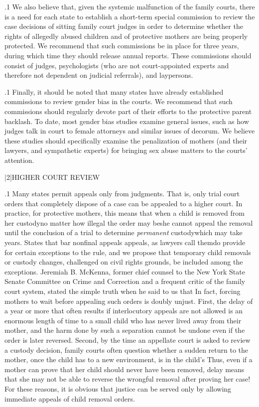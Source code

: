 \documentclass[11pt, twoside]{article}
\begin{document}
{\p.1{%
We also believe that, given the systemic malfunction of the family
courts, there is a need for each state to establish a short-term special
commission to review the case decisions of sitting family court judges
in order to determine whether the rights of allegedly abused children
and of protective mothers are being properly protected. We recommend
that such commissions be in place for three years, during which time
they should release annual reports. These commissions should consist of judges, psychologists (who are not court-appointed experts and
therefore not dependent on judicial referrals), and laypersons.
}%

\p.1{%
Finally, it should be noted that many states have already established
commissions to review gender bias in the courts. We recommend that
such commissions should regularly devote part of their efforts to the
protective parent backlash. To date, most gender bias studies examine
general issues, such as how judges talk in court to female attorneys and
similar issues of decorum. We believe these studies should specifically
examine the penalization of mothers (and their lawyers, and sympathetic experts) for bringing sex abuse matters to the courts’ attention.
}%


\s|2|{HIGHER COURT REVIEW}

\p.1{%
\noindent{}Many states permit appeals only from  judgments. That is, only
trial court orders that completely dispose of a case can be appealed to a
higher court. In practice, for protective mothers, this means that when a
child is  removed from her custody\mdash{}no matter how illegal
the order may be\mdash{}she cannot appeal the removal until the conclusion of a trial to determine \textit{permanent} custody\mdash{}which may take years.
States that bar nonfinal appeals\mdash{} appeals, as lawyers call
them\mdash{}do provide for certain exceptions to the rule, and we propose that
temporary child removals or custody changes, challenged on civil rights
grounds, be included among the exceptions. Jeremiah B. McKenna, former chief counsel to the New York State Senate Committee on Crime
and Correction and a frequent critic of the family court system, stated
the simple truth when he said to us that  In
fact, forcing mothers to wait before appealing such orders is doubly unjust. First, the delay of a year or more that often results if interlocutory
appeals are not allowed is an enormous length of time to a small child
who has never lived away from their mother, and the harm done by such
a separation cannot be undone even if the order is later reversed. Second,
by the time an appellate court is asked to review a custody decision, family courts often question whether a sudden return to the mother, once
the child has  to a new environment, is in the child’s  Thus, even if a mother can prove that her child should never
have been removed, delay means that she may not be able to reverse the
wrongful removal after proving her case! For these reasons, it is obvious
that justice can be served only by allowing immediate appeals of child
removal orders.
}%

}
\end{document}
